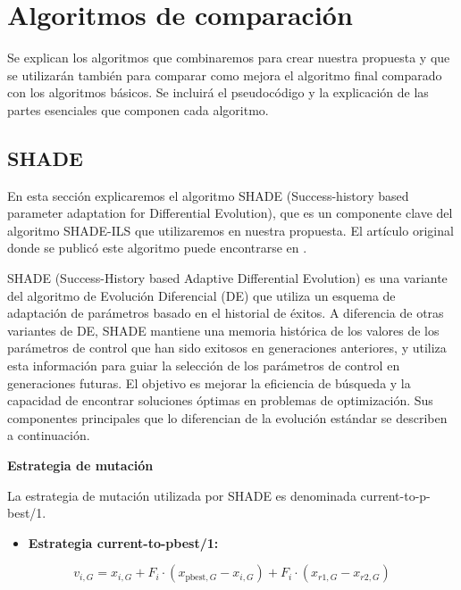
\chapter{Algoritmos de comparación}

Se explican los algoritmos que combinaremos para crear nuestra propuesta y que se utilizarán también para comparar como mejora el algoritmo final comparado con los algoritmos básicos. Se incluirá el pseudocódigo y la explicación de las partes esenciales que componen cada algoritmo.

\section{SHADE}

En esta sección explicaremos el algoritmo SHADE (Success-history based parameter adaptation for Differential Evolution), que es un componente clave del algoritmo SHADE-ILS que utilizaremos en nuestra propuesta. El artículo original donde se publicó este algoritmo puede encontrarse en \cite{TanabeShade}.

\textbf{\vspace{10px}}

\noindent SHADE (Success-History based Adaptive Differential Evolution) es una variante del algoritmo de Evolución Diferencial (DE) que utiliza un esquema de adaptación de parámetros basado en el historial de éxitos. A diferencia de otras variantes de DE, SHADE mantiene una memoria histórica de los valores de los parámetros de control que han sido exitosos en generaciones anteriores, y utiliza esta información para guiar la selección de los parámetros de control en generaciones futuras. El objetivo es mejorar la eficiencia de búsqueda y la capacidad de encontrar soluciones óptimas en problemas de optimización. Sus componentes principales que lo diferencian de la evolución estándar se describen a continuación.

\vspace{10px}

\noindent\textbf{Estrategia de mutación}
\newline

\noindent La estrategia de mutación utilizada por SHADE es denominada current-to-p-best/1.

\begin{itemize}
\item \textbf{Estrategia current-to-pbest/1:}
\end{itemize}
\begin{equation}
v_{i,G} = x_{i,G} + F_i \cdot (x_{\text{pbest},G} - x_{i,G}) + F_i \cdot (x_{r1,G} - x_{r2,G})
\label{eq:mutation_strategy}
\end{equation}

